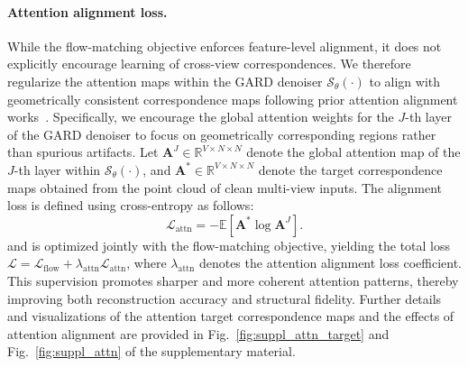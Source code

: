 \paragraph{Attention alignment loss.}
While the flow-matching objective enforces feature-level alignment, it does not explicitly encourage learning of cross-view correspondences. We therefore regularize the attention maps within the GARD denoiser $\mathcal{S}_{\theta}(\cdot)$ to align with geometrically consistent correspondence maps following prior attention alignment works~\cite{kwon2025cameo, nam2025emergenttemporalcorrespondencesvideo, jin2025matrixmasktrackalignment}. Specifically, we encourage the global attention weights for the $J$-th layer of the GARD denoiser to focus on geometrically corresponding regions rather than spurious artifacts. Let $\mathbf{A}^J \in \mathbb{R}^{V \times N \times N}$ denote the global attention map of the $J$-th layer within $\mathcal{S}_{\theta}(\cdot)$, and $\mathbf{A}^* \in \mathbb{R}^{V \times N \times N}$ denote the target correspondence maps obtained from the point cloud of clean multi-view inputs. The alignment loss is defined using cross-entropy as follows:
\begin{equation}
\mathcal{L}_{\text{attn}} = - \mathbb{E} \left[ \mathbf{A}^{*} \log \mathbf{A}^{J} \right].
\end{equation}
and is optimized jointly with the flow-matching objective, yielding the total loss $\mathcal{L} = \mathcal{L}_{\text{flow}} + \lambda_{\text{attn}} \mathcal{L}_{\text{attn}}$, where $\lambda_\text{attn}$ denotes the attention alignment loss coefficient. This supervision promotes sharper and more coherent attention patterns, thereby improving both reconstruction accuracy and structural fidelity. Further details and visualizations of the attention target correspondence maps and the effects of attention alignment are provided in Fig.~\ref{fig:suppl_attn_target} and Fig.~\ref{fig:suppl_attn} of the supplementary material.

